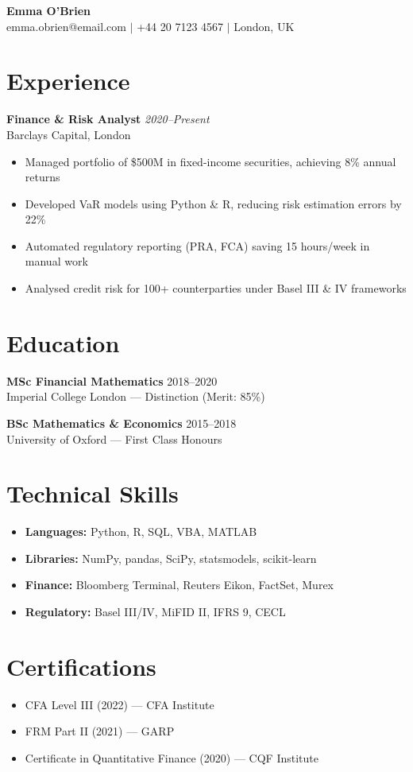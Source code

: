\documentclass[11pt,a4paper]{article}
\begin{document}
\begin{center}
  {\Large\textbf{Emma O'Brien}} \\
  emma.obrien@email.com $|$ +44 20 7123 4567 $|$ London, UK
\end{center}

\section{Experience}

\textbf{Finance \& Risk Analyst} \hfill \textit{2020--Present} \\
Barclays Capital, London
\begin{itemize}
  \item Managed portfolio of \$500M in fixed-income securities, achieving 8\% annual returns
  \item Developed VaR models using Python \& R, reducing risk estimation errors by 22\%
  \item Automated regulatory reporting (PRA, FCA) saving 15 hours/week in manual work
  \item Analysed credit risk for 100+ counterparties under Basel III \& IV frameworks
\end{itemize}

\section{Education}

\textbf{MSc Financial Mathematics} \hfill 2018--2020 \\
Imperial College London --- Distinction (Merit: 85\%)

\textbf{BSc Mathematics \& Economics} \hfill 2015--2018 \\
University of Oxford --- First Class Honours

\section{Technical Skills}

\begin{itemize}
  \item \textbf{Languages:} Python, R, SQL, VBA, MATLAB
  \item \textbf{Libraries:} NumPy, pandas, SciPy, statsmodels, scikit-learn
  \item \textbf{Finance:} Bloomberg Terminal, Reuters Eikon, FactSet, Murex
  \item \textbf{Regulatory:} Basel III/IV, MiFID II, IFRS 9, CECL
\end{itemize}

\section{Certifications}

\begin{itemize}
  \item CFA Level III (2022) --- CFA Institute
  \item FRM Part II (2021) --- GARP
  \item Certificate in Quantitative Finance (2020) --- CQF Institute
\end{itemize}
\end{document}

